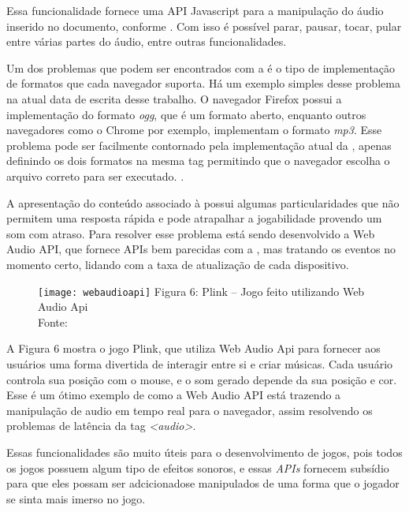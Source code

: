 Essa funcionalidade fornece uma API Javascript para a manipulação do
áudio inserido no documento, conforme
.
Com isso é possível parar, pausar, tocar,
pular entre várias partes do áudio, entre outras funcionalidades.

Um dos problemas que podem ser encontrados com a \tagaudio  é o tipo de
implementação de formatos que cada navegador suporta. Há um exemplo
simples desse problema na atual data de escrita desse trabalho. O
navegador Firefox possui a implementação do formato \textit{ogg}, que
é um formato aberto, enquanto outros navegadores como o Chrome por
exemplo, implementam o formato \textit{mp3}. Esse problema pode ser
facilmente contornado pela implementação atual da \tagaudio,
apenas definindo os dois formatos na mesma tag permitindo que o
navegador escolha o arquivo correto para ser executado. \cite{pfeiffer2010definitive}.

A apresentação do conteúdo associado à \tagaudio  possui algumas particularidades que não permitem uma
resposta rápida e pode atrapalhar a jogabilidade provendo um som com
atraso. Para resolver esse problema está sendo desenvolvido a
Web Audio API, que fornece APIs bem parecidas com a \tagaudio, mas
tratando os eventos no momento certo, lidando com a taxa de
atualização de cada dispositivo.

\begin{figure}[H]
  \centering
	\texttt{[image: webaudioapi]}
	\footnotesize\hspace{8\baselineskip}
	Figura 6: Plink {--} Jogo feito utilizando Web Audio Api \\
	Fonte: \cite{website:plink}
  \label{img:webaudioapi}
\end{figure}

A Figura 6 mostra o jogo Plink, que utiliza Web
Audio Api para fornecer aos usuários uma forma divertida de interagir
entre si e criar músicas. Cada usuário controla sua posição com o
mouse, e o som gerado depende da sua posição e cor. Esse é um ótimo
exemplo de como a Web Audio API está trazendo a manipulação de audio
em tempo real para o navegador, assim resolvendo os problemas de
latência da tag \textit{<audio>}.

Essas funcionalidades são muito úteis para o desenvolvimento de jogos, pois
todos os jogos possuem algum tipo de efeitos sonoros, e essas
\textit{APIs} fornecem subsídio para que eles possam ser adcicionadose
manipulados de uma forma que o jogador se sinta mais imerso no jogo.

